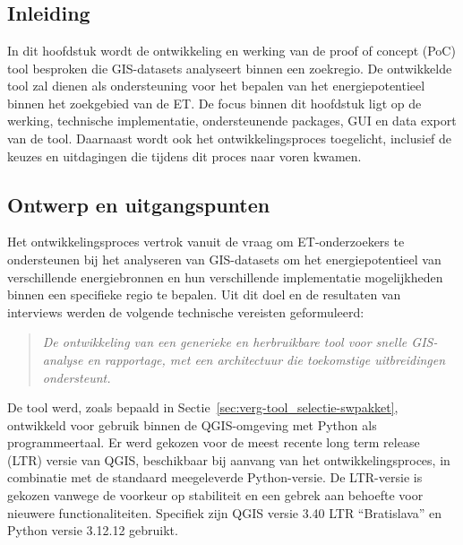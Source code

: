 
\chapter{}\label{ch:ontwikkelingTool}
\section{Inleiding}

In dit hoofdstuk wordt de ontwikkeling en werking van de proof of concept (PoC) tool besproken die GIS-datasets analyseert binnen een zoekregio.
De ontwikkelde tool zal dienen als ondersteuning voor het bepalen van het energiepotentieel binnen het zoekgebied van de ET. De focus binnen dit hoofdstuk ligt op de werking, technische implementatie, ondersteunende packages, GUI en data export van de tool. Daarnaast wordt ook het ontwikkelingsproces toegelicht, inclusief de keuzes en uitdagingen die tijdens dit proces naar voren kwamen.

\section{Ontwerp en uitgangspunten}\label{sec:ontwikkelingTool_totstandkoming}

Het ontwikkelingsproces vertrok vanuit de vraag om ET-onderzoekers te ondersteunen bij het analyseren van GIS-datasets om het energiepotentieel van verschillende energiebronnen en hun verschillende implementatie mogelijkheden binnen een specifieke regio te bepalen.
Uit dit doel en de resultaten van interviews werden de volgende technische vereisten geformuleerd:
\begin{quote}
\textit{De ontwikkeling van een generieke en herbruikbare tool voor snelle GIS-analyse en rapportage, met een architectuur die toekomstige uitbreidingen ondersteunt.}
\end{quote}

De tool werd, zoals bepaald in Sectie~\ref{sec:verg-tool_selectie-swpakket}, ontwikkeld voor gebruik binnen de QGIS-omgeving met Python als programmeertaal. 
Er werd gekozen voor de meest recente long term release (LTR) versie van QGIS, beschikbaar bij aanvang van het ontwikkelingsproces, in combinatie met de standaard meegeleverde Python-versie. De LTR-versie is gekozen vanwege de voorkeur op stabiliteit en een gebrek aan behoefte voor nieuwere functionaliteiten. Specifiek zijn QGIS versie 3.40 LTR “Bratislava” en Python versie 3.12.12 gebruikt.\medskip


